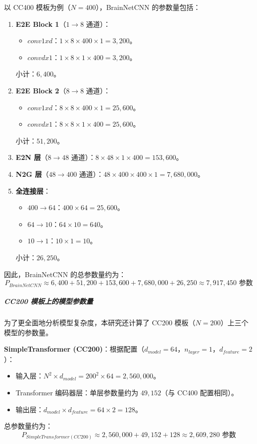 \documentclass[12pt,a4paper]{article}
\begin{document}
以 CC400 模板为例（$N=400$），BrainNetCNN 的参数量包括：

\begin{enumerate}
\item \textbf{E2E Block 1}（$1 \rightarrow 8$ 通道）：
  \begin{itemize}
  \item $conv1xd$：$1 \times 8 \times 400 \times 1 = 3,200$。
  \item $convdx1$：$1 \times 8 \times 1 \times 400 = 3,200$。
  \end{itemize}
  小计：$6,400$。

\item \textbf{E2E Block 2}（$8 \rightarrow 8$ 通道）：
  \begin{itemize}
  \item $conv1xd$：$8 \times 8 \times 400 \times 1 = 25,600$。
  \item $convdx1$：$8 \times 8 \times 1 \times 400 = 25,600$。
  \end{itemize}
  小计：$51,200$。

\item \textbf{E2N 层}（$8 \rightarrow 48$ 通道）：$8 \times 48 \times 1 \times 400 = 153,600$。

\item \textbf{N2G 层}（$48 \rightarrow 400$ 通道）：$48 \times 400 \times 400 \times 1 = 7,680,000$。

\item \textbf{全连接层}：
  \begin{itemize}
  \item $400 \rightarrow 64$：$400 \times 64 = 25,600$。
  \item $64 \rightarrow 10$：$64 \times 10 = 640$。
  \item $10 \rightarrow 1$：$10 \times 1 = 10$。
  \end{itemize}
  小计：$26,250$。
\end{enumerate}

因此，BrainNetCNN 的总参数量约为：
\begin{equation}
P_{BrainNetCNN} \approx 6,400 + 51,200 + 153,600 + 7,680,000 + 26,250 \approx 7,917,450 \text{ 参数}
\end{equation}

\subparagraph{CC200 模板上的模型参数量}

为了更全面地分析模型复杂度，本研究还计算了 CC200 模板（$N=200$）上三个模型的参数量。

\textbf{SimpleTransformer (CC200)}：根据配置（$d_{model}=64$，$n_{layer}=1$，$d_{feature}=2$）：
\begin{itemize}
\item 输入层：$N^2 \times d_{model} = 200^2 \times 64 = 2,560,000$。
\item Transformer 编码器层：单层参数量约为 $49,152$（与 CC400 配置相同）。
\item 输出层：$d_{model} \times d_{feature} = 64 \times 2 = 128$。
\end{itemize}
总参数量约为：
\begin{equation}
P_{SimpleTransformer(CC200)} \approx 2,560,000 + 49,152 + 128 \approx 2,609,280 \text{ 参数}
\end{equation}
\end{document}

